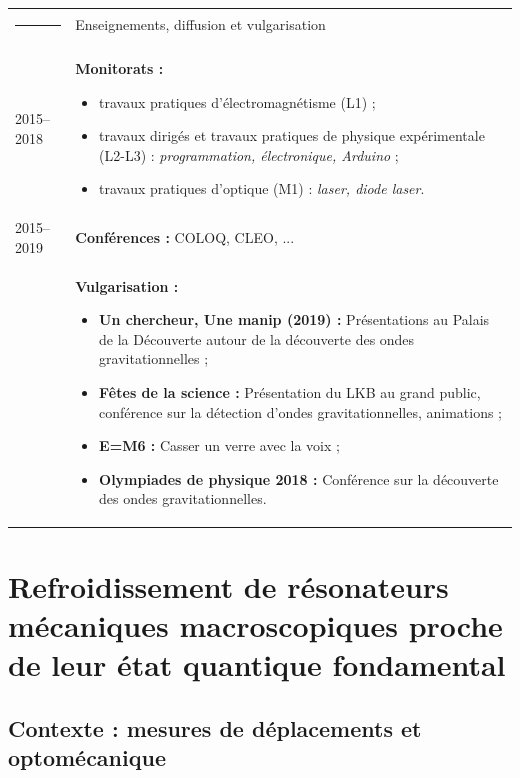\documentclass[12pt,a4paper]{article}
\begin{document}
\begin{tabular*}{\textwidth}{p{}<{\raggedleft}p{}}
\textcolor{theme}{\rule{0.12\textwidth}{2.5mm}} &
\large\textcolor{theme}{Enseignements, diffusion et vulgarisation} \vspace{3pt} \\
2015--2018 & \textbf{Monitorats :}
\begin{itemize}
\item travaux pratiques d'électromagnétisme (L1) ;
\item travaux dirigés et travaux pratiques de physique expérimentale (L2-L3) : \textit{programmation, électronique, Arduino} ;
\item travaux pratiques d'optique (M1) : \textit{laser, diode laser}.
\end{itemize}\\
2015--2019 &
\textbf{Conférences :} COLOQ, CLEO, ... \vspace{3pt} \\
& \textbf{Vulgarisation :}
\begin{itemize}
\item \textbf{Un chercheur, Une manip (2019) :} Présentations au Palais de la Découverte autour de la découverte des ondes gravitationnelles ;
\item \textbf{Fêtes de la science :} Présentation du LKB au grand public, conférence sur la détection d'ondes gravitationnelles, animations ;
\item \textbf{E=M6 :} Casser un verre avec la voix ;
\item \textbf{Olympiades de physique 2018 :} Conférence sur la découverte des ondes gravitationnelles.
\end{itemize}
\end{tabular*}

\section{Refroidissement de résonateurs mécaniques macroscopiques proche de leur état quantique fondamental}

\subsection{Contexte : mesures de déplacements et optomécanique}
\end{document}
